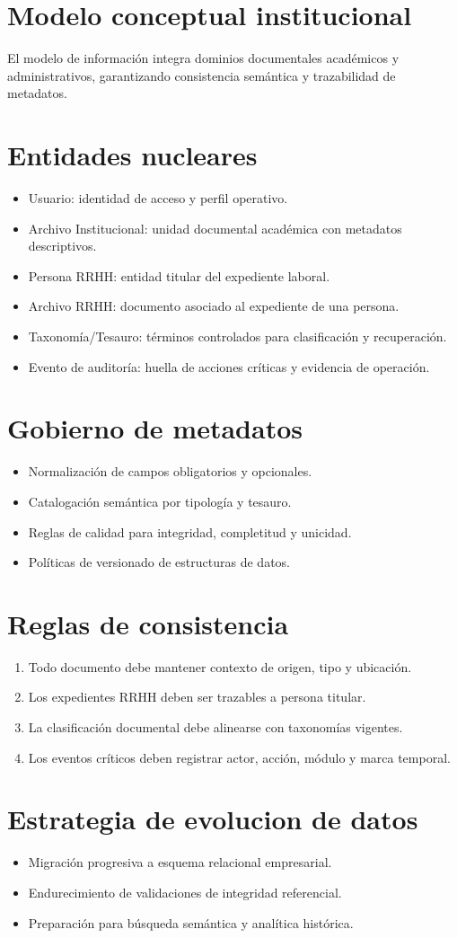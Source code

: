 \section{Modelo conceptual institucional}
El modelo de información integra dominios documentales académicos y administrativos, garantizando consistencia semántica y trazabilidad de metadatos.

\section{Entidades nucleares}
\begin{itemize}
  \item Usuario: identidad de acceso y perfil operativo.
  \item Archivo Institucional: unidad documental académica con metadatos descriptivos.
  \item Persona RRHH: entidad titular del expediente laboral.
  \item Archivo RRHH: documento asociado al expediente de una persona.
  \item Taxonomía/Tesauro: términos controlados para clasificación y recuperación.
  \item Evento de auditoría: huella de acciones críticas y evidencia de operación.
\end{itemize}

\section{Gobierno de metadatos}
\begin{itemize}
  \item Normalización de campos obligatorios y opcionales.
  \item Catalogación semántica por tipología y tesauro.
  \item Reglas de calidad para integridad, completitud y unicidad.
  \item Políticas de versionado de estructuras de datos.
\end{itemize}

\section{Reglas de consistencia}
\begin{enumerate}
  \item Todo documento debe mantener contexto de origen, tipo y ubicación.
  \item Los expedientes RRHH deben ser trazables a persona titular.
  \item La clasificación documental debe alinearse con taxonomías vigentes.
  \item Los eventos críticos deben registrar actor, acción, módulo y marca temporal.
\end{enumerate}

\section{Estrategia de evolucion de datos}
\begin{itemize}
  \item Migración progresiva a esquema relacional empresarial.
  \item Endurecimiento de validaciones de integridad referencial.
  \item Preparación para búsqueda semántica y analítica histórica.
\end{itemize}
